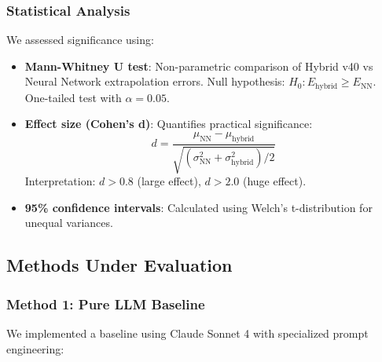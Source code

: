 \subsubsection{Statistical Analysis}

We assessed significance using:

\begin{itemize}
    \item \textbf{Mann-Whitney U test}: Non-parametric comparison of Hybrid v40 vs Neural Network extrapolation errors. Null hypothesis: $H_0: E_{\text{hybrid}} \geq E_{\text{NN}}$. One-tailed test with $\alpha = 0.05$.

    \item \textbf{Effect size (Cohen's d)}: Quantifies practical significance:
    \begin{equation}
    d = \frac{\mu_{\text{NN}} - \mu_{\text{hybrid}}}{\sqrt{(\sigma_{\text{NN}}^2 + \sigma_{\text{hybrid}}^2)/2}}
    \end{equation}
    Interpretation: $d > 0.8$ (large effect), $d > 2.0$ (huge effect).

    \item \textbf{95\% confidence intervals}: Calculated using Welch's t-distribution for unequal variances.
\end{itemize}


\subsection{Methods Under Evaluation}

\subsubsection{Method 1: Pure LLM Baseline}

We implemented a baseline using Claude Sonnet 4 with specialized prompt engineering:

